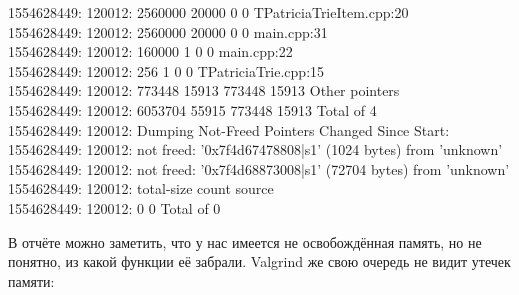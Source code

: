 \documentclass[12pt]{article}
\begin{document}
{{		1554628449: 120012:     2560000  20000           0      0  TPatriciaTrieItem.cpp:20\\
		1554628449: 120012:     2560000  20000           0      0  main.cpp:31\\
		1554628449: 120012:      160000      1           0      0  main.cpp:22\\
		1554628449: 120012:         256      1           0      0  TPatriciaTrie.cpp:15\\
		1554628449: 120012:      773448  15913      773448  15913  Other pointers\\
		1554628449: 120012:     6053704  55915      773448  15913  Total of 4\\
		1554628449: 120012: Dumping Not-Freed Pointers Changed Since Start:\\
		1554628449: 120012:  not freed: '0x7f4d67478808|s1' (1024 bytes) from 'unknown'\\
		1554628449: 120012:  not freed: '0x7f4d68873008|s1' (72704 bytes) from 'unknown'\\
		1554628449: 120012:  total-size  count  source\\
		1554628449: 120012:           0      0  Total of 0\\
}}

В отчёте можно заметить, что у нас имеется не освобождённая память, но не понятно, из какой функции её забрали. Valgrind же свою очередь не видит утечек памяти: 
\end{document}
